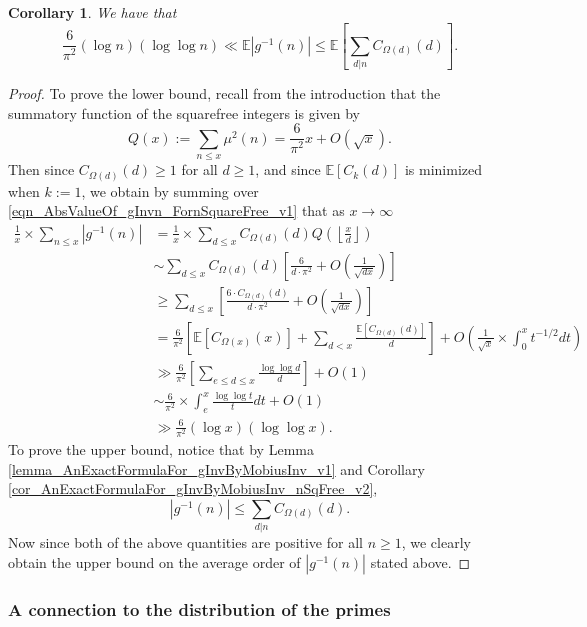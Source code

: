 \documentclass[11pt,reqno,a4letter]{article}
\numberwithin{figure}{section}
\numberwithin{table}{section}
\newcommand{\Floor}[2]{\ensuremath{\left\lfloor \frac{#1}{#2} \right\rfloor}}
\theoremstyle{plain}
\newtheorem{cor}[theorem]{Corollary}
\numberwithin{theorem}{section}
\theoremstyle{definition}
\begin{document}
\begin{cor} 
\label{lemma_BddExpectationOfgInvn} 
We have that 
\[
\frac{6}{\pi^2} (\log n) (\log\log n) \ll 
     \mathbb{E}|g^{-1}(n)| \leq 
     \mathbb{E}\left[\sum_{d|n} C_{\Omega(d)}(d)\right]. 
\]
\end{cor} 
\begin{proof} 
To prove the lower bound, 
recall from the introduction that the summatory function of the 
squarefree integers is given by 
\[
Q(x) := \sum_{n \leq x} \mu^2(n) = \frac{6}{\pi^2} x + O(\sqrt{x}). 
\]
Then since $C_{\Omega(d)}(d) \geq 1$ for all $d \geq 1$, and since 
$\mathbb{E}[C_k(d)]$ is minimized when $k := 1$, we obtain by summing over 
\eqref{eqn_AbsValueOf_gInvn_FornSquareFree_v1} that as $x \rightarrow \infty$ 
\begin{align*} 
\frac{1}{x} \times \sum_{n \leq x} |g^{-1}(n)| & = \frac{1}{x} \times \sum_{d \leq x} 
     C_{\Omega(d)}(d) Q\left(\Floor{x}{d}\right) \\ 
     & \sim \sum_{d \leq x} C_{\Omega(d)}(d) \left[\frac{6}{d \cdot \pi^2} + O\left(\frac{1}{\sqrt{dx}}\right) 
     \right] \\ 
     & \geq \sum_{d \leq x} \left[\frac{6 \cdot C_{\Omega(d)}(d)}{d \cdot \pi^2} + 
     O\left(\frac{1}{\sqrt{dx}}\right)\right] \\ 
     & = \frac{6}{\pi^2} \left[\mathbb{E}[C_{\Omega(x)}(x)] + \sum_{d<x} 
     \frac{\mathbb{E}[C_{\Omega(d)}(d)]}{d}\right] + 
     O\left(\frac{1}{\sqrt{x}} \times \int_0^{x} t^{-1/2} dt\right) \\ 
     & \gg \frac{6}{\pi^2} \left[\sum_{e \leq d \leq x} 
     \frac{\log\log d}{d}\right] + O(1) \\ 
     & \sim \frac{6}{\pi^2} \times \int_{e}^{x} \frac{\log\log t}{t} dt + O(1) \\ 
     & \gg \frac{6}{\pi^2} (\log x) (\log\log x). 
\end{align*} 
To prove the upper bound, notice that by 
Lemma \ref{lemma_AnExactFormulaFor_gInvByMobiusInv_v1} and 
Corollary \ref{cor_AnExactFormulaFor_gInvByMobiusInv_nSqFree_v2}, 
\[
|g^{-1}(n)| \leq \sum_{d|n} C_{\Omega(d)}(d). 
\]
Now since both of the above quantities are positive for all $n \geq 1$, 
we clearly obtain the upper bound on the average order of $|g^{-1}(n)|$
stated above. 
\end{proof} 

\subsubsection{A connection to the distribution of the primes} 
\end{document}
